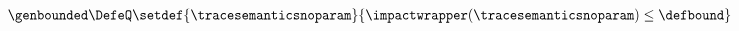\begin{gather*}
  \genbounded\DefeQ
  \setdef{\tracesemanticsnoparam}{\impactwrapper(\tracesemanticsnoparam)\le \defbound}
\end{gather*}
